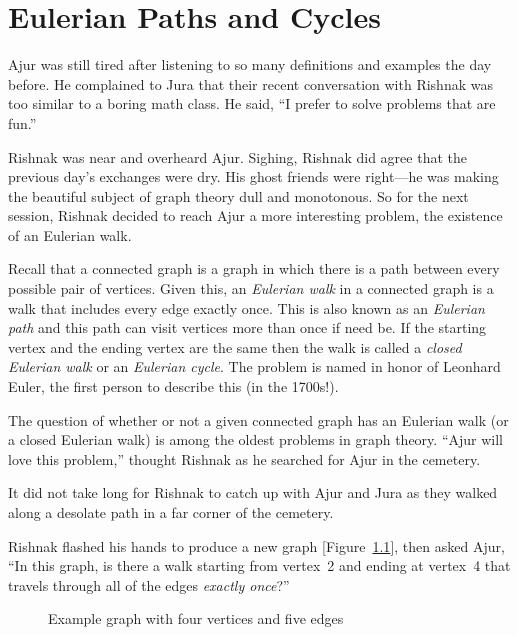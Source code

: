 \chapter{Eulerian Paths and Cycles}

Ajur was still tired after listening to so many definitions and examples the day before. He complained to Jura that their recent conversation with Rishnak was too similar to a boring math class. He said, ``I prefer to solve problems that are fun.''

Rishnak was near and overheard Ajur. Sighing, Rishnak did agree that the previous day's exchanges were dry. His ghost friends were right---he was making the beautiful subject of graph theory dull and monotonous. So for the next session, Rishnak decided to reach Ajur a more interesting problem, the existence of an Eulerian   walk.

Recall that a connected graph is a graph in which there is a path between every possible pair of vertices. Given this, an \textit{Eulerian walk} in a connected graph is a walk that includes every edge exactly once. This is also known as an \textit{Eulerian path} and this path can visit vertices more than once if need be. If the starting vertex and the ending vertex are the same then the walk is called a \textit{closed Eulerian walk} or an \textit{Eulerian cycle}. The problem is named in honor of Leonhard Euler, the first person to describe this (in the 1700s!).

The question of whether or not a given connected graph has an Eulerian walk (or a closed Eulerian walk) is among the oldest problems in graph theory. ``Ajur will love this problem,'' thought Rishnak as he searched for Ajur in the cemetery.

It did not take long for Rishnak to catch up with Ajur and Jura as they walked along a desolate path in a far corner of the cemetery.

Rishnak flashed his hands to produce a new graph [Figure~\ref{4g1}], then asked Ajur, ``In this graph, is there a walk starting from vertex~2 and ending at vertex~4 that travels through all of the edges \textit{exactly once}?''

\begin{figure}
\begin{center}
\caption{Example graph with four vertices and five edges}\label{4g1}
\end{center}
\end{figure}

